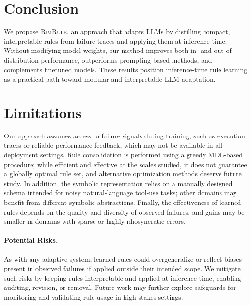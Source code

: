 \documentclass[11pt]{article}
\newcommand{\shortname}{\textsc{RimRule}\xspace}
\begin{document}


\section{Conclusion}

We propose \shortname, an approach that adapts LLMs by distilling compact, interpretable rules
from failure traces and applying them at inference time. Without modifying model weights, our
method improves both in- and out-of-distribution performance, outperforms prompting-based
methods, and complements finetuned models. These results position inference-time rule learning
as a practical path toward modular and interpretable LLM adaptation.



\section{Limitations}

Our approach assumes access to failure signals during training, such as execution traces or
reliable performance feedback, which may not be available in all deployment settings. Rule
consolidation is performed using a greedy MDL-based procedure; while efficient and effective
at the scales studied, it does not guarantee a globally optimal rule set, and alternative
optimization methods deserve future study.
In addition, the symbolic representation relies on a manually designed
schema intended for noisy natural-language tool-use tasks; other domains may benefit from
different symbolic abstractions. 
Finally, the effectiveness
of learned rules depends on the quality and diversity of observed failures, and gains may be
smaller in domains with sparse or highly idiosyncratic errors.

\paragraph{Potential Risks.}
As with any adaptive system, learned rules could overgeneralize or reflect biases present in
observed failures if applied outside their intended scope. We mitigate such risks by keeping
rules interpretable and applied at inference time, enabling auditing, revision, or removal.
Future work may further explore safeguards for monitoring and validating rule usage in
high-stakes settings.
\end{document}

